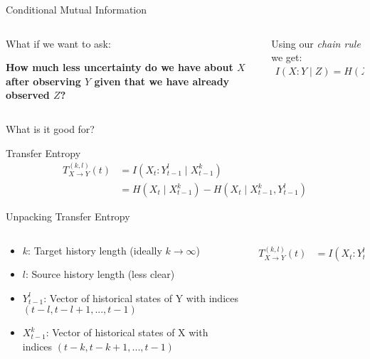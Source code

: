\documentclass{cubeamer}
\begin{document}
\begin{frame}{Conditional Mutual Information}
    \begin{columns}
        \begin{column}{0.5\textwidth}
            What if we want to ask:
            
            \textbf{How much less uncertainty do we have about $X$ after observing $Y$ given that we have already observed $Z$?}
        \end{column}
        \begin{column}{0.5\textwidth}
            Using our \textit{chain rule} we get:
            \begin{align*}
                I(X:Y \mid Z) = H(X \mid Z) - H(X \mid Y,Z)
            \end{align*}
        \end{column}
    \end{columns}
\end{frame}

\begin{frame}{What is it good for?}
\end{frame}

\begin{frame}{Transfer Entropy}
    \huge
    \begin{align*}
       T^{(k, l)}_{X \rightarrow Y}(t) &= I \left(X_t : Y_{t-1}^{l} \mid X_{t-1}^{k} \right ) \\
                                    &= H \left ( X_{t} \mid X_{t-1}^{k} \right ) - H \left ( X_t \mid    X_{t-1}^{k}, Y_{t-1}^{l} \right )
    \end{align*}
\end{frame}

\begin{frame}{Unpacking Transfer Entropy}
    \begin{columns}
        \begin{column}{0.7\textwidth}
            \begin{itemize}
                \item $k$: Target history length (ideally $k \rightarrow \infty$)
                \item $l$: Source history length (less clear)
                \item $Y_{t-1}^l$: Vector of historical states of Y with indices $(t-l, t-l+1, ..., t - 1)$
                \item $X_{t-1}^k$: Vector of historical states of X with indices $(t-k, t-k+1,..., t-1)$
            \end{itemize}
            
        \end{column}
        \begin{column}{0.3\textwidth}
            \begin{align*}
                T^{(k, l)}_{X \rightarrow Y}(t) &= I \left(X_t : Y_{t-1}^{l} \mid X_{t-1}^{k} \right )
            \end{align*}
        \end{column}
    \end{columns}
            
\end{frame}
\end{document}
